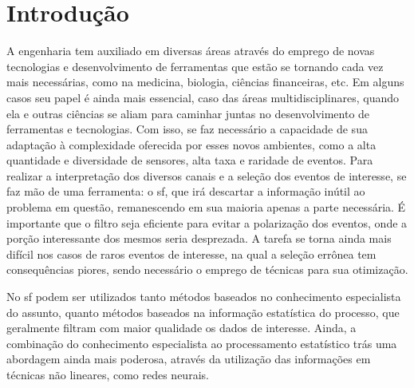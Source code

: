 \chapter{Introdução}
\label{cap:intro}
\glsresetall


A engenharia tem auxiliado em diversas áreas através do emprego de
novas tecnologias e desenvolvimento de ferramentas que estão se tornando cada
vez mais necessárias, como na medicina, biologia, ciências financeiras, etc. Em 
alguns casos seu papel é ainda mais essencial, caso das áreas
multidisciplinares, quando ela e outras ciências se aliam para caminhar juntas no
desenvolvimento de ferramentas e tecnologias. Com isso, se faz necessário a
capacidade de sua adaptação à complexidade oferecida por esses novos ambientes, 
como a alta quantidade e diversidade de sensores, alta taxa e raridade de
eventos. Para realizar a interpretação dos diversos canais e a seleção dos eventos 
de interesse, se faz mão de uma ferramenta: o \glsdesc{sf}, que irá descartar a 
informação inútil ao problema em questão, remanescendo em sua maioria apenas
a parte necessária. É importante que o filtro seja eficiente para evitar a polarização
dos eventos, onde a porção interessante dos mesmos seria desprezada.
A tarefa se torna ainda mais difícil nos casos de raros
eventos de interesse, na qual a seleção errônea tem consequências piores,
sendo necessário o emprego de técnicas para sua otimização. 

No \glsdesc{sf} podem ser utilizados tanto métodos baseados no conhecimento 
especialista do assunto, quanto métodos baseados na informação estatística do processo, 
que geralmente filtram com maior qualidade os dados de interesse. Ainda, 
a combinação do conhecimento especialista ao processamento 
estatístico trás uma abordagem ainda mais poderosa, através da utilização das informações 
em técnicas não lineares, como redes neurais.



